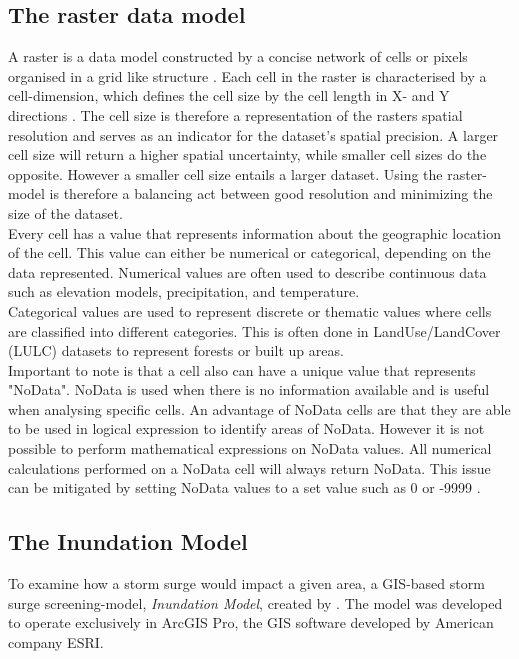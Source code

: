 \subsection{The raster data model}

A raster is a data model constructed by a concise network of cells or pixels organised in a grid like structure \citep{bolstad_gis_2022,esri_raster}. Each cell in the raster is characterised by a cell-dimension, which defines the cell size by the cell length in X- and Y directions \citep{bolstad_gis_2022}. The cell size is therefore a representation of the rasters spatial resolution and serves as an indicator for the dataset's spatial precision. A larger cell size will return a higher spatial uncertainty, while smaller cell sizes do the opposite. However a smaller cell size entails a larger dataset. Using the raster-model is therefore a balancing act between good resolution and minimizing the size of the dataset.\\

Every cell has a value that represents information about the geographic location of the cell. This value can either be numerical or categorical, depending on the data represented. Numerical values are often used to describe continuous data such as elevation models, precipitation, and temperature.\\
Categorical values are used to represent discrete or thematic values where cells are classified into different categories. This is often done in LandUse/LandCover (LULC) datasets to represent forests or built up areas.\\

Important to note is that a cell also can have a unique value that represents "NoData". NoData is used when there is no information available and is useful when analysing specific cells. An advantage of NoData cells are that they are able to be used in logical expression to identify areas of NoData. However it is not possible to perform mathematical expressions on NoData values. All numerical calculations performed on a NoData cell will always return NoData. This issue can be mitigated by setting NoData values to a set value such as 0 or -9999 \citep{bolstad_gis_2022}.\\

\subsection{The Inundation Model}
To examine how a storm surge would impact a given area, a GIS-based storm surge screening-model, \textit{Inundation Model}, created by \cite{balstrom_kirby_inundation}. The model was developed to operate exclusively in ArcGIS Pro, the GIS software developed by American company ESRI.\\

